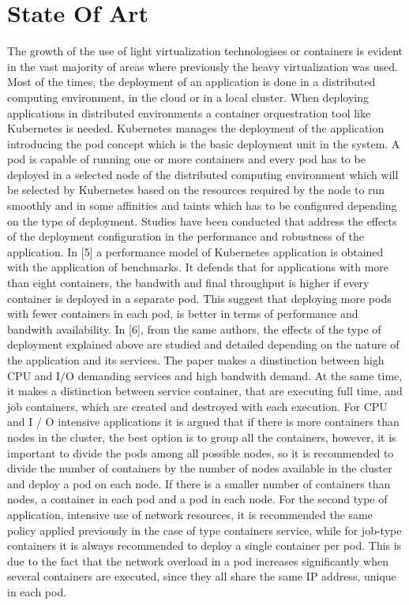 \documentclass[conference]{IEEEtran}
\begin{document}
\section{State Of Art}
The growth of the use of light virtualization technologises or containers is evident in the vast majority of areas where previously the heavy virtualization was used.
Most of the times, the deployment of an application is done in a distributed computing environment, in the cloud or in a local cluster. When deploying
applications in distributed environments a container orquestration tool like Kubernetes is needed. Kubernetes manages the deployment of the application introducing
the pod concept which is the basic deployment unit in the system. A pod is capable of running one or more containers and every pod has to be deployed in 
a selected node of the distributed computing environment which will be selected by Kubernetes based on the resources required by the node to run smoothly and
in some affinities and taints which has to be configured depending on the type of deployment. Studies have been conducted that address the effects of the deployment 
configuration in the performance and robustness of the application. In [5] a performance model of Kubernetes application is obtained with the application of benchmarks.
It defends that for applications with more than eight containers, the bandwith and final throughput is higher if every container is deployed in a separate pod. This suggest
that deploying more pods with fewer containers in each pod, is better in terms of performance and bandwith availability. In [6], from the same authors, the 
effects of the type of deployment explained above are studied and detailed depending on the nature of the application and its services. The paper makes a
dinstinction between high CPU and I/O demanding services and high bandwith demand. At the same time, it makes a distinction between service container,
that are executing full time, and job containers, which are created and destroyed with each execution. 
For CPU and I / O intensive applications it is argued that if there is more containers than nodes in the cluster, the best option is to group all the 
containers, however, it is important to divide the pods among all possible nodes, so it is recommended to divide the number of containers by the number of nodes 
available in the cluster and deploy a pod on each node. If there is a smaller number of containers than nodes, a container in each pod and a pod in each node. 
For the second type of application, intensive use of network resources, it is recommended the same policy applied previously in the case of type containers
service, while for job-type containers it is always recommended to deploy a single container per pod. This is due to the fact that the network overload in a pod
increases significantly when several containers are executed, since they all share the same IP address, unique in each pod.
\end{document}
